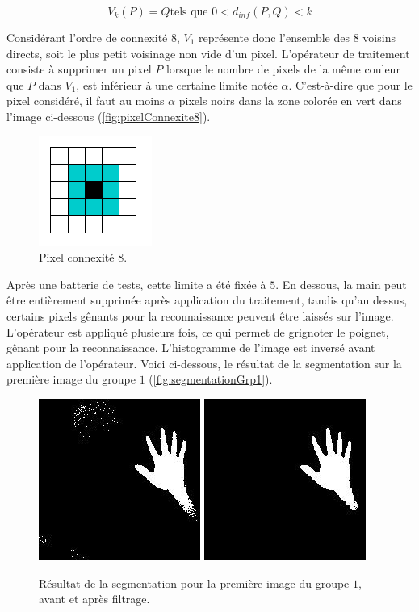 \[
V_k(P) = Q \text{tels que $0 < d_{inf}(P,Q) < k$}
\]

Considérant l’ordre de connexité $8$, $V_1$ représente donc l’ensemble des $8$ voisins directs, soit le plus petit voisinage non vide d’un pixel. L’opérateur de traitement consiste à supprimer un pixel $P$ lorsque le nombre de pixels de la même couleur que $P$ dans $V_1$, est inférieur à une certaine limite notée $\alpha$.  C'est-à-dire que pour le pixel considéré, il faut au moins $\alpha$ pixels noirs dans la zone colorée en vert dans l’image ci-dessous (\autoref{fig:pixelConnexite8}).

\begin{figure}[htb!]
\centerline{\includegraphics{connexite8.png}}
\caption{Pixel connexité 8.}
\label{fig:pixelConnexite8}
\end{figure}

Après une batterie de tests, cette limite a été fixée à $5$. En dessous, la main peut être entièrement supprimée après application du traitement, tandis qu’au dessus, certains pixels gênants pour la reconnaissance peuvent être laissés sur l’image. L’opérateur est appliqué plusieurs fois, ce qui permet de grignoter le poignet, gênant pour la reconnaissance. L’histogramme de l’image est inversé avant application de l’opérateur. Voici ci-dessous, le résultat de la segmentation sur la première image du groupe $1$ (\autoref{fig:segmentationGrp1}).

\begin{figure}
\centerline{
\includegraphics[scale=0.6]{segIn.jpg}
\includegraphics[scale=0.6]{segOut.jpg}
}
\caption{Résultat de la segmentation pour la première image du groupe $1$, avant et après filtrage.}
\label{fig:segmentationGrp1}
\end{figure}

